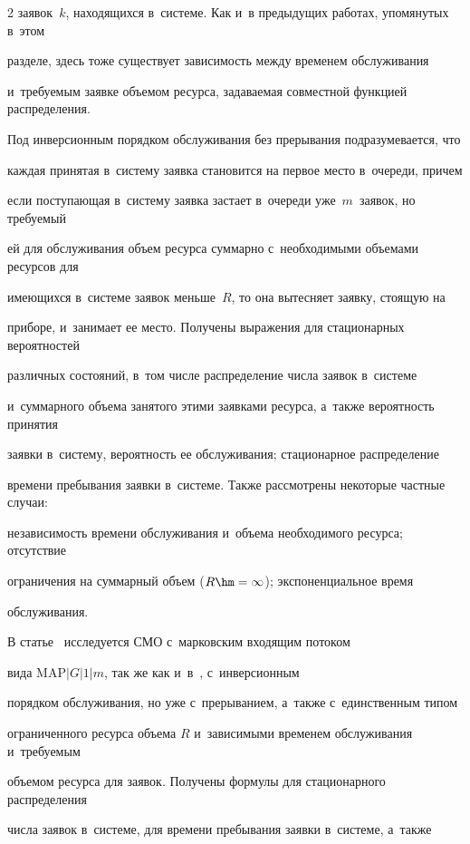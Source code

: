 \begin{multicols}{2}
заявок~$k$, находящихся в~сис\-те\-ме. Как и~в предыду\-щих работах, упомянутых в~этом 


разделе, здесь тоже существует зависимость между временем обслуживания 


и~требуемым заявке объемом ресурса, задаваемая совместной функцией распределения. 


Под инверсионным порядком обслуживания без прерывания подразумевается, что 


каждая принятая в~сис\-те\-му заявка становится на первое место в~очереди, причем 


если поступающая в~сис\-те\-му заявка застает в~очереди уже~$m$~заявок, но требуемый 


ей для обслуживания объем ресурса суммарно с~необходимыми объемами ресурсов для 


имеющихся в~сис\-те\-ме заявок меньше~$R$, то она вытесняет заявку, стоящую на 


приборе, и~занимает ее место. Получены выражения для стационарных вероятностей 


различных состояний, в~том числе распределение числа заявок в~сис\-те\-ме 


и~суммарного объема занятого этими заявками ресурса, а~также вероятность принятия 


заявки в~сис\-те\-му, вероятность ее обслуживания; стационарное распределение 


времени пребывания заявки в~сис\-те\-ме. Также рассмотрены некоторые частные случаи: 


независимость времени обслуживания и~объема необходимого ресурса; отсутствие 


ограничения на суммарный объем ($R\hm=\infty$); экспоненциальное время 


обслуживания.





В статье~\cite{Pechinkin_31_1999} исследуется СМО с~марковским входящим потоком 


вида $\mathrm{MAP}|G|1|m$, так же как и~в~\cite{Pechinkin_30_1998}, с~инверсионным 


порядком обслуживания, но уже с~прерыванием, а~также с~единственным типом 


ограниченного ресурса объема $R$ и~зависимыми временем обслуживания и~требуемым 


объемом ресурса для заявок. Получены формулы для стационарного распределения 


числа заявок в~сис\-те\-ме, для времени пребывания заявки в~сис\-те\-ме, а~также 



\end{multicols}

